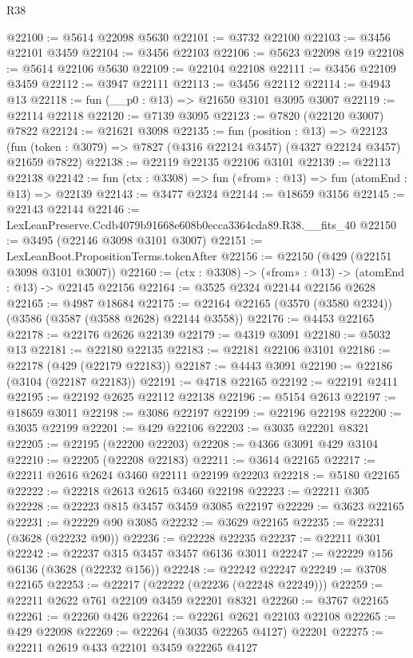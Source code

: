 \begin{lexlean}{R38}
\begin{coremodule}
@22100 := @5614 @22098 @5630
@22101 := @3732 @22100
@22103 := @3456 @22101 @3459
@22104 := @3456 @22103
@22106 := @5623 @22098 @19
@22108 := @5614 @22106 @5630
@22109 := @22104 @22108
@22111 := @3456 @22109 @3459
@22112 := @3947 @22111
@22113 := @3456 @22112
@22114 := @4943 @13
@22118 := fun (__p0 : @13) => @21650 @3101 @3095 @3007
@22119 := @22114 @22118
@22120 := @7139 @3095
@22123 := @7820 (@22120 @3007) @7822
@22124 := @21621 @3098
@22135 := fun (position : @13) =>
  @22123 (fun (token : @3079) => @7827 (@4316 @22124 @3457) (@4327 @22124 @3457) @21659 @7822)
@22138 := @22119 @22135 @22106 @3101
@22139 := @22113 @22138
@22142 := fun (ctx : @3308) => fun («from» : @13) => fun (atomEnd : @13) => @22139
@22143 := @3477 @2324
@22144 := @18659 @3156
@22145 := @22143 @22144
@22146 := LexLeanPreserve.Ccdb4079b91668e608b0ecca3364cda89.R38.__fits_40
@22150 := @3495 (@22146 @3098 @3101 @3007)
@22151 := LexLeanBoot.PropositionTerms.tokenAfter
@22156 := @22150 (@429 (@22151 @3098 @3101 @3007))
@22160 := (ctx : @3308) -> («from» : @13) -> (atomEnd : @13) -> @22145 @22156
@22164 := @3525 @2324 @22144 @22156 @2628
@22165 := @4987 @18684
@22175 := @22164 @22165 (@3570 (@3580 @2324)) (@3586 (@3587 (@3588 @2628) @22144 @3558))
@22176 := @4453 @22165
@22178 := @22176 @2626 @22139
@22179 := @4319 @3091
@22180 := @5032 @13
@22181 := @22180 @22135
@22183 := @22181 @22106 @3101
@22186 := @22178 (@429 (@22179 @22183))
@22187 := @4443 @3091
@22190 := @22186 (@3104 (@22187 @22183))
@22191 := @4718 @22165
@22192 := @22191 @2411
@22195 := @22192 @2625 @22112 @22138
@22196 := @5154 @2613
@22197 := @18659 @3011
@22198 := @3086 @22197
@22199 := @22196 @22198
@22200 := @3035 @22199
@22201 := @429 @22106
@22203 := @3035 @22201 @8321
@22205 := @22195 (@22200 @22203)
@22208 := @4366 @3091 @429 @3104
@22210 := @22205 (@22208 @22183)
@22211 := @3614 @22165
@22217 := @22211 @2616 @2624 @3460 @22111 @22199 @22203
@22218 := @5180 @22165
@22222 := @22218 @2613 @2615 @3460 @22198
@22223 := @22211 @305
@22228 := @22223 @815 @3457 @3459 @3085 @22197
@22229 := @3623 @22165
@22231 := @22229 @90 @3085
@22232 := @3629 @22165
@22235 := @22231 (@3628 (@22232 @90))
@22236 := @22228 @22235
@22237 := @22211 @301
@22242 := @22237 @315 @3457 @3457 @6136 @3011
@22247 := @22229 @156 @6136 (@3628 (@22232 @156))
@22248 := @22242 @22247
@22249 := @3708 @22165
@22253 := @22217 (@22222 (@22236 (@22248 @22249)))
@22259 := @22211 @2622 @761 @22109 @3459 @22201 @8321
@22260 := @3767 @22165
@22261 := @22260 @426
@22264 := @22261 @2621 @22103 @22108
@22265 := @429 @22098
@22269 := @22264 (@3035 @22265 @4127) @22201
@22275 := @22211 @2619 @433 @22101 @3459 @22265 @4127

\end{coremodule}
\end{lexlean}
